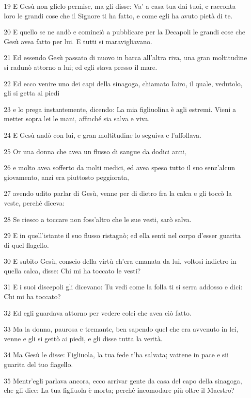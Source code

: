 \par 19 E Gesù non glielo permise, ma gli disse: Va' a casa tua dai tuoi, e racconta loro le grandi cose che il Signore ti ha fatto, e come egli ha avuto pietà di te.
\par 20 E quello se ne andò e cominciò a pubblicare per la Decapoli le grandi cose che Gesù avea fatto per lui. E tutti si maravigliavano.
\par 21 Ed essendo Gesù passato di nuovo in barca all'altra riva, una gran moltitudine si radunò attorno a lui; ed egli stava presso il mare.
\par 22 Ed ecco venire uno dei capi della sinagoga, chiamato Iairo, il quale, vedutolo, gli si getta ai piedi
\par 23 e lo prega instantemente, dicendo: La mia figliuolina è agli estremi. Vieni a metter sopra lei le mani, affinché sia salva e viva.
\par 24 E Gesù andò con lui, e gran moltitudine lo seguiva e l'affollava.
\par 25 Or una donna che avea un flusso di sangue da dodici anni,
\par 26 e molto avea sofferto da molti medici, ed avea speso tutto il suo senz'alcun giovamento, anzi era piuttosto peggiorata,
\par 27 avendo udito parlar di Gesù, venne per di dietro fra la calca e gli toccò la veste, perché diceva:
\par 28 Se riesco a toccare non foss'altro che le sue vesti, sarò salva.
\par 29 E in quell'istante il suo flusso ristagnò; ed ella sentì nel corpo d'esser guarita di quel flagello.
\par 30 E subito Gesù, conscio della virtù ch'era emanata da lui, voltosi indietro in quella calca, disse: Chi mi ha toccato le vesti?
\par 31 E i suoi discepoli gli dicevano: Tu vedi come la folla ti si serra addosso e dici: Chi mi ha toccato?
\par 32 Ed egli guardava attorno per vedere colei che avea ciò fatto.
\par 33 Ma la donna, paurosa e tremante, ben sapendo quel che era avvenuto in lei, venne e gli si gettò ai piedi, e gli disse tutta la verità.
\par 34 Ma Gesù le disse: Figliuola, la tua fede t'ha salvata; vattene in pace e sii guarita del tuo flagello.
\par 35 Mentr'egli parlava ancora, ecco arrivar gente da casa del capo della sinagoga, che gli dice: La tua figliuola è morta; perché incomodare più oltre il Maestro?
